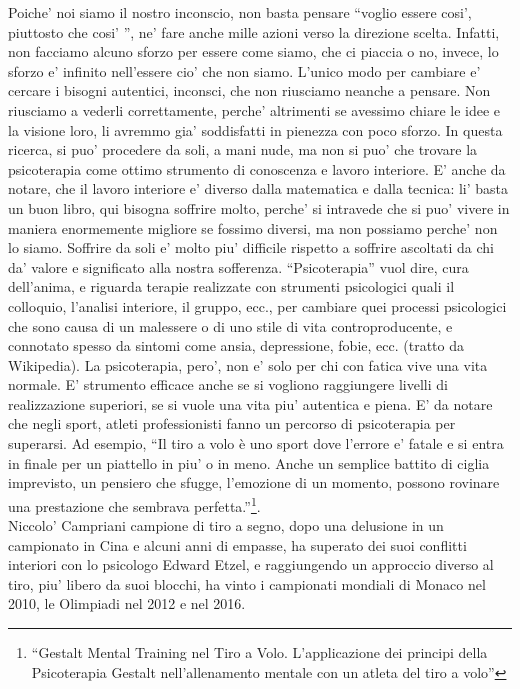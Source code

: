 Poiche' noi siamo il nostro inconscio, non basta pensare ``voglio essere cosi', piuttosto che cosi' '', ne' fare anche mille azioni verso la direzione scelta. Infatti, non facciamo alcuno sforzo per essere come siamo, che ci piaccia o no, invece, lo sforzo e' infinito nell'essere cio' che non siamo. L'unico modo per cambiare e' cercare i bisogni autentici, inconsci, che non riusciamo neanche a pensare. Non riusciamo a vederli correttamente, perche' altrimenti se avessimo chiare le idee e la visione loro, li avremmo gia' soddisfatti in pienezza con poco sforzo. In questa ricerca, si puo' procedere da soli, a mani nude, ma non si puo' che trovare la psicoterapia come ottimo strumento di conoscenza e lavoro interiore. E' anche da notare, che il lavoro interiore e' diverso dalla matematica e dalla tecnica: li' basta un buon libro, qui bisogna soffrire molto, perche' si intravede che si puo' vivere in maniera enormemente migliore se fossimo diversi, ma non possiamo perche' non lo siamo. Soffrire da soli e' molto piu' difficile rispetto a soffrire ascoltati da chi da' valore e significato alla nostra sofferenza.
``Psicoterapia'' vuol dire, cura dell'anima, e riguarda terapie realizzate con strumenti psicologici quali il colloquio, l'analisi interiore, il gruppo, ecc., per cambiare quei processi psicologici che sono causa di un malessere o di uno stile di vita controproducente, e connotato spesso da sintomi come ansia, depressione, fobie, ecc. (tratto da Wikipedia).
La psicoterapia, pero', non e' solo per chi con fatica vive una vita normale. E' strumento efficace anche se si vogliono raggiungere livelli di realizzazione superiori, se si vuole una vita piu' autentica e piena.
E' da notare che negli sport, atleti professionisti fanno un percorso di psicoterapia per superarsi. Ad esempio, ``Il tiro a volo è uno sport dove l’errore e' fatale e si entra in finale per un piattello in piu' o in meno. Anche un semplice battito di ciglia imprevisto, un pensiero che sfugge, l’emozione di un momento, possono rovinare una prestazione che sembrava perfetta.''\footnote{ ``Gestalt Mental Training nel Tiro a Volo. L'applicazione dei principi della Psicoterapia Gestalt nell'allenamento mentale con un atleta del tiro a volo''}.\\
Niccolo' Campriani campione di tiro a segno, dopo una delusione in un campionato in Cina e alcuni anni di empasse, ha superato dei suoi conflitti interiori con lo psicologo Edward Etzel, e raggiungendo un approccio diverso al tiro, piu' libero da suoi blocchi, ha vinto i campionati mondiali di Monaco nel 2010, le Olimpiadi nel 2012 e nel 2016.

